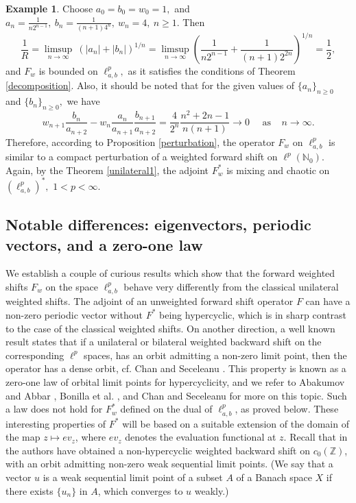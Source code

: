 \documentclass[12pt, reqno]{amsart}
\theoremstyle{definition}
\newtheorem{example}[theorem]{Example}
\theoremstyle{remark}
\numberwithin{equation}{section}
\begin{document}
 \begin{example}
    Choose $a_{0}=b_{0}=w_{0}=1,$ and $a_{n}=\frac{1}{n2^{n-1}},~ b_{n}=\frac{1}{(n+1)4^{n}},~ w_{n}=4, ~n\geq 1$. Then
    \[
\frac{1}{R}=\limsup_{n\rightarrow \infty} ~(|a_n|+|b_n|)^{1/n}=\limsup_{n\rightarrow \infty}\left(\frac{1}{n2^{n-1}}+\frac{1}{(n+1)2^{2n}}\right)^{1/n}=\frac{1}{2},
\]
 and $F_{w}$ is bounded on $\ell^p_{a,b},$ as it satisfies the conditions of Theorem \ref{decomposition}. Also, it should be noted that for the given values of $\{a_{n}\}_{n\geq 0}$ and $\{b_{n}\}_{n\geq 0},$ we have 
    \[
    w_{n+1}\frac{b_{n}}{a_{n+2}}-w_{n}\frac{a_n}{a_{n+1}}\frac{b_{n+1}}{a_{n+2}}=\frac{4}{2^{n}}\frac{n^{2}+2n-1}{n(n+1)}\to 0~~~~~~\text{as}~~~~~n\to \infty.
    \] 
Therefore, according to Proposition \ref{perturbation}, the operator $F_{w}$ on $\ell^{p}_{a,b}$ is similar to a compact perturbation of a weighted forward shift on $\ell^p(\mathbb{N}_{0}).$ Again, by the Theorem \ref{unilateral1}, the adjoint $F_{w}^{*}$ is  mixing and chaotic on $(\ell^p_{a,b})^{*},$ $1<p<\infty$.
\end{example}

   
     

\subsection{Notable differences: eigenvectors, periodic vectors, and a zero-one law}
We establish a couple of curious results which show that the forward weighted shifts $F_{w}$ on the space $\ell^p_{a,b}$ behave very differently from the classical unilateral weighted shifts. The adjoint of an unweighted forward shift operator $F$ can have a non-zero periodic vector without $F^{*}$ being hypercyclic, which is in sharp contrast to the case of the classical weighted shifts.  On another direction, a well known result states that if a unilateral or bilateral weighted backward shift on the corresponding $\ell^p$ spaces, has an orbit admitting a non-zero limit point, then the operator has a dense orbit, cf. Chan and Seceleanu \cite{Kit1}. This property is known as a zero-one law of orbital limit points for hypercyclicity, and we refer to Abakumov and Abbar \cite{Abakumov-Abbar},  Bonilla et al. \cite{Bonilla-Cardeccia}, and Chan and Seceleanu \cite{Kit} for more on this topic. Such a law does not hold for $F^*_w$ defined on the dual of $\ell^p_{a,b}$, as proved below. These interesting properties of $F^*$ will be based on a suitable extension of the domain of the map $z\mapsto ev_z$, where $ev_z$ denotes the evaluation functional at $z$. Recall that in \cite{Bonilla-Cardeccia} the authors have obtained a non-hypercyclic weighted backward shift on $c_0(\mathbb{Z})$, with an orbit admitting non-zero weak sequential limit points. (We say that a vector $u$ is a weak sequential limit point of a subset $A$ of a Banach space $X$ if there exists $\{u_n\}$ in $A$, which converges to $u$ weakly.)
\end{document}
